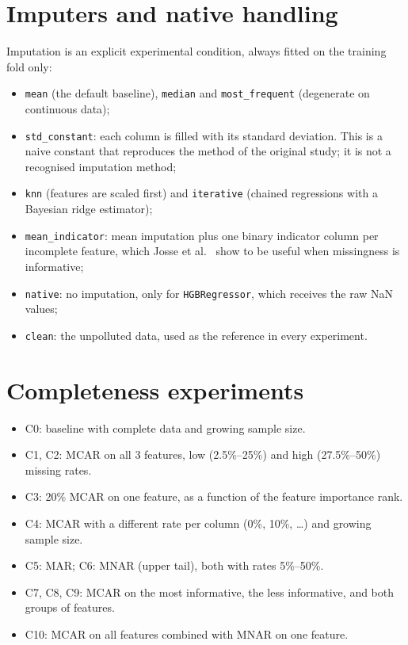 \documentclass{Configuration_Files/PoliMi3i_thesis}
\begin{document}
\section{Imputers and native handling}
\label{sec:imputers}%
Imputation is an explicit experimental condition, always fitted on the training fold only:
\begin{itemize}
    \item \texttt{mean} (the default baseline), \texttt{median} and \texttt{most\_frequent} (degenerate on continuous data);
    \item \texttt{std\_constant}: each column is filled with its standard deviation. This is a naive constant that reproduces the method of the original study; it is not a recognised imputation method;
    \item \texttt{knn} (features are scaled first) and \texttt{iterative} (chained regressions with a Bayesian ridge estimator);
    \item \texttt{mean\_indicator}: mean imputation plus one binary indicator column per incomplete feature, which Josse et al.~\cite{josse2019} show to be useful when missingness is informative;
    \item \texttt{native}: no imputation, only for \texttt{HGBRegressor}, which receives the raw NaN values;
    \item \texttt{clean}: the unpolluted data, used as the reference in every experiment.
\end{itemize}

\section{Completeness experiments}
\label{sec:completeness_exps}%
\begin{itemize}
    \item C0: baseline with complete data and growing sample size.
    \item C1, C2: MCAR on all 3 features, low (2.5\%--25\%) and high (27.5\%--50\%) missing rates.
    \item C3: 20\% MCAR on one feature, as a function of the feature importance rank.
    \item C4: MCAR with a different rate per column (0\%, 10\%, \ldots) and growing sample size.
    \item C5: MAR; C6: MNAR (upper tail), both with rates 5\%--50\%.
    \item C7, C8, C9: MCAR on the most informative, the less informative, and both groups of features.
    \item C10: MCAR on all features combined with MNAR on one feature.
\end{itemize}
\end{document}
